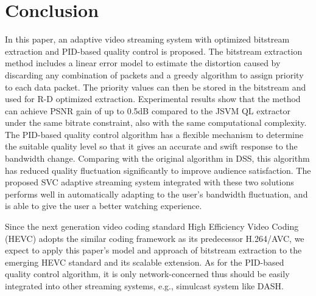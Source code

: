 \documentclass[journal]{IEEEtran}
\begin{document}
\section{Conclusion}
\label{sec:conclusion}

In this paper, an adaptive video streaming system with optimized bitstream extraction and PID-based quality control is proposed. The bitstream extraction method includes a linear error model to estimate the distortion caused by discarding any combination of packets and a greedy algorithm to assign priority to each data packet. The priority values can then be stored in the bitstream and used for R-D optimized extraction. Experimental results show that the method can achieve PSNR gain of up to 0.5dB compared to the JSVM QL extractor under the same bitrate constraint, also with the same computational complexity. The PID-based quality control algorithm has a flexible mechanism to determine the suitable quality level so that it gives an accurate and swift response to the bandwidth change. Comparing with the original algorithm in DSS, this algorithm has reduced quality fluctuation significantly to improve audience satisfaction. The proposed SVC adaptive streaming system integrated with these two solutions performs well in automatically adapting to the user's bandwidth fluctuation, and is able to give the user a better watching experience.

Since the next generation video coding standard High Efficiency Video Coding (HEVC) \cite{HEVC} adopts the similar coding framework as its predecessor H.264/AVC, we expect to apply this paper's model and approach of bitstream extraction to the emerging HEVC standard and its scalable extension. As for the PID-based quality control algorithm, it is only network-concerned thus should be easily integrated into other streaming systems, e.g., simulcast system like DASH.


\ifCLASSOPTIONcaptionsoff
  \newpage
\fi




\end{document}
